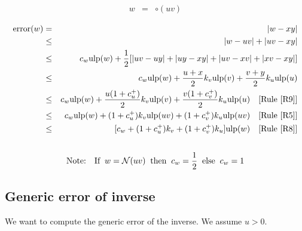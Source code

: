 \documentclass[12pt]{amsart}
\def\ulp{{\rm ulp}}
\def\N{{\mathcal N}}
\newcommand{\U}[1]{\quad \mbox{[Rule~\ref{#1}]}}
\DeclareMathOperator{\error}{error}
\begin{document}
\begin{eqnarray}\nonumber
w&=&\circ(uv) \\\nonumber
\end{eqnarray}
\begin{eqnarray}\nonumber
\error(w)& = &|w - xy| \\\nonumber
& \leq &|w - u v| +|u v - x y| \\\nonumber
& \leq & c_w \ulp(w) +  \frac{1}{2} [|u v-u y|+|u y-x y|+|u v-x v|+|x v-x y|]\\\nonumber
& \leq & c_w \ulp(w) +  \frac{u+x}{2} k_v \ulp(v) + \frac{v+y}{2} k_u \ulp(u)\\\nonumber
& \leq & c_w \ulp(w) +  \frac{u(1+c_u^+)}{2} k_v \ulp(v) + \frac{v(1+c_v^+)}{2} k_u \ulp(u) \U{R9}\\\nonumber
& \leq & c_w \ulp(w) +  (1+c_u^+) k_v \ulp(uv) + (1+c_v^+) k_u \ulp(uv) \U{R5}\\\nonumber
& \leq & [ c_w +  (1+c_u^+) k_v + (1+c_v^+) k_u ] \ulp(w)\U{R8}\\\nonumber
\end{eqnarray}
\begin{eqnarray}\nonumber
\textnormal{Note:}&&\textnormal{If}\;\; w=\N(uv) \;\;\textnormal{then}\;\; c_w =\frac{1}{2} \;\;\textnormal{else}\;\; c_w =1
\end{eqnarray}

\subsection{Generic error of inverse}\label{generic:inv}

We want to compute the generic error of the inverse.
We assume $u > 0$.
\end{document}
